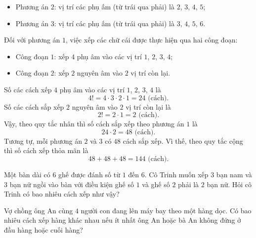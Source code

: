\begin{bt}
{\begin{enumerate}
\begin{itemize}
				\item Phương án $2$: vị trí các phụ ấm (từ trái qua phải) là $2$, $3$, $4$, $5$;
				\item Phương án $3$: vị trí các phụ ấm (từ trái qua phải) là $3$, $4$, $5$, $6$.
			\end{itemize}
			Đối với phương án $1$, việc xếp các chữ cái được thực hiện qua hai công đoạn:
			\begin{itemize}
				\item Công đoạn $1$: xếp $4$ phụ âm vào các vị trí $1$, $2$, $3$, $4$;
				\item Công đoạn $2$: xếp $2$ nguyên âm vào $2$ vị trí còn lại.
			\end{itemize}
			Số các cách xếp $4$ phụ âm vào các vị trí $1$, $2$, $3$, $4$ là
			$$4! = 4 \cdot 3 \cdot 2 \cdot1 = 24 \text{ (cách)}.$$
			Số các cách sắp xếp $2$ nguyên âm vào $2$ vị trí còn lại là
			$$2! = 2 \cdot 1 = 2 \text{ (cách)}.$$
			Vậy, theo quy tắc nhân thì số cách sắp xếp theo phương án $1$ là
			$$24 \cdot 2 = 48 \text{ (cách)}.$$
			Tương tự, mỗi phương án $2$ và $3$ có $48$ cách sắp xếp. Vì thế, theo quy tắc cộng thì số cách xếp thỏa mãn là
			$$48 + 48 + 48 = 144 \text{ (cách)}.$$
		\end{enumerate}
	}
\end{bt}

\begin{bt}%
	Một bàn dài có $6$ ghế được đánh số từ $1$ đến $6$. Cô Trinh muốn xếp $3$ bạn nam và $3$ bạn nữ ngồi vào bàn với điều kiện ghế số $1$ và ghế số $2$ phải là $2$ bạn nữ. Hỏi cô Trinh có bao nhiêu cách xếp như vậy?
\end{bt}

\begin{bt}%
	Vợ chồng ông An cùng $4$ người con đang lên máy bay theo một hàng dọc. Có bao nhiêu cách xếp hàng khác nhau nếu ít nhất ông An hoặc bà An không đứng ở đầu hàng hoặc cuối hàng?
\end{bt}

